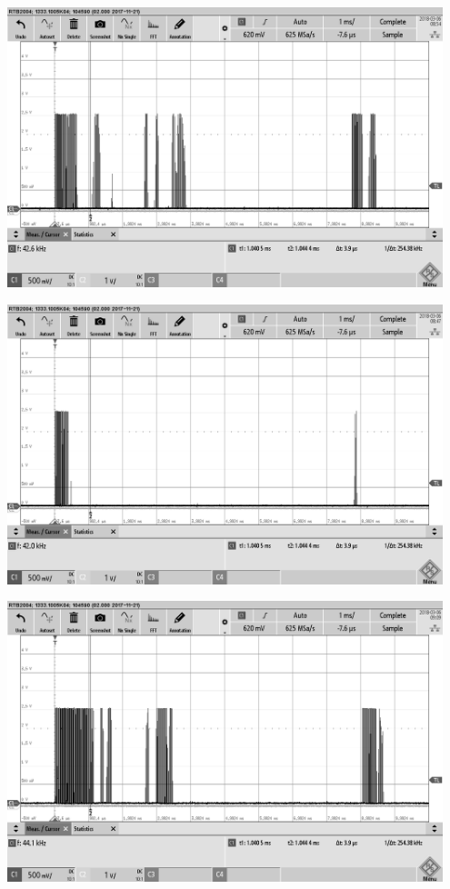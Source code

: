 \begin{minipage}{0.5\textwidth}
\includegraphics[width=0.95\textwidth, draft]{Abbildungen/Messungen4,6V/MURATAr1,5m.png}
\label{fig:EKULIT1,5m}
\end{minipage}
\begin{minipage}{0.5\textwidth}
\includegraphics[width=0.95\textwidth, draft]{Abbildungen/Messungen4,6V/MURATAs1,5m.png}
\label{fig:EKULIT1,5m}
\end{minipage}
\begin{minipage}{0.5\textwidth}
\includegraphics[width=0.95\textwidth, draft]{Abbildungen/Messungen4,6V/MURATAsr1,5m.png}
\label{fig:EKULIT1,5m}
\end{minipage}


